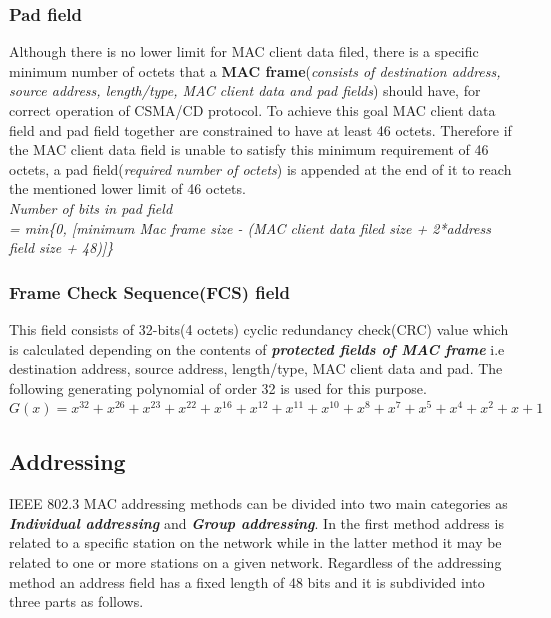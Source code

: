\documentclass[a4paper,11pt]{article}%
\begin{document}
\subsubsection{Pad field}
Although there is no lower limit for MAC client data filed, there is a specific minimum number of octets that a \textbf{MAC frame}(\textit{consists of destination address, source address, length/type, MAC client data and pad fields}) should have, for  correct operation of  CSMA/CD protocol. To achieve this goal MAC client data field and pad field together are constrained to have at least 46 octets. Therefore if the  MAC client data field is unable to satisfy this minimum requirement of 46 octets, a pad field(\textit{required number of octets}) is appended at the end of it to reach the mentioned lower limit of 46 octets.\\

\textit{Number of bits in pad field \\
\hspace*{3cm}= min\{0, [minimum Mac frame size - (MAC client data filed size + 2*address field size + 48)]\}}


   
\subsubsection{Frame Check Sequence(FCS) field}
This field consists of 32-bits(4 octets)  cyclic redundancy check(CRC) value which is calculated depending on the contents of \textit{\textbf{protected fields of MAC frame}} i.e destination address, source address, length/type, MAC client data and pad. The following generating polynomial of order 32 is used for this purpose.\\

$ G(x) =  x^{32} + x^{26} + x^{23} + x^{22} + x^{16} + x^{12} + x^{11} + x^{10} + x^8 + x^7 + x^5 + x^4 + x^2 + x + 1$























\subsection{Addressing}
IEEE 802.3 MAC addressing methods can be divided into two main categories as \textbf{\textit{Individual addressing}} and \textbf{\textit{Group addressing}}. In the first method  address is related to a specific station on the network while in the latter method it may be related to one or more stations on a given network. Regardless of the addressing method an address field has a fixed length of 48 bits and it is subdivided into three parts as follows. 
\end{document}
